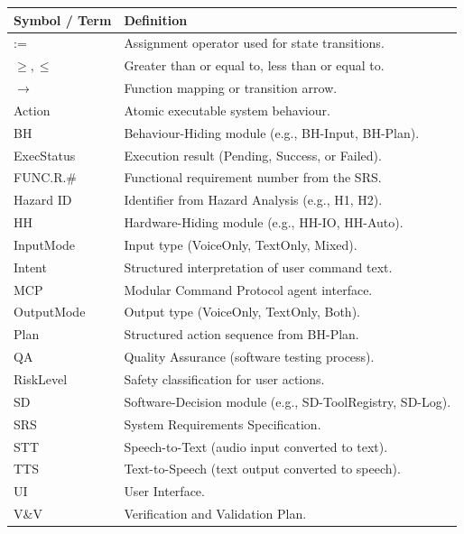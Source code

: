 \documentclass[12pt, titlepage]{article}
\begin{document}
\begin{center}
\renewcommand{\arraystretch}{1.2}
\begin{tabular}{p{3cm} p{11cm}}
\toprule
Symbol / Term & Definition \\
\midrule
:= & Assignment operator used for state transitions.\\
$\geq, \leq$ & Greater than or equal to, less than or equal to.\\
$\rightarrow$ & Function mapping or transition arrow.\\
Action & Atomic executable system behaviour.\\
BH & Behaviour-Hiding module (e.g., BH-Input, BH-Plan).\\
ExecStatus & Execution result (Pending, Success, or Failed).\\
FUNC.R.\# & Functional requirement number from the SRS.\\
Hazard ID & Identifier from Hazard Analysis (e.g., H1, H2).\\
HH & Hardware-Hiding module (e.g., HH-IO, HH-Auto).\\
InputMode & Input type (VoiceOnly, TextOnly, Mixed).\\
Intent & Structured interpretation of user command text.\\
MCP & Modular Command Protocol agent interface.\\
OutputMode & Output type (VoiceOnly, TextOnly, Both).\\
Plan & Structured action sequence from BH-Plan.\\
QA & Quality Assurance (software testing process).\\
RiskLevel & Safety classification for user actions.\\
SD & Software-Decision module (e.g., SD-ToolRegistry, SD-Log).\\
SRS & System Requirements Specification.\\
STT & Speech-to-Text (audio input converted to text).\\
TTS & Text-to-Speech (text output converted to speech).\\
UI & User Interface.\\
V\&V & Verification and Validation Plan.\\
\bottomrule
\end{tabular}
\end{center}

\newpage

\tableofcontents

\listoftables
\end{document}
